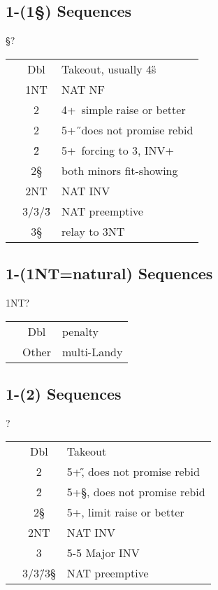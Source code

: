\subsection{1\D-(1\S) Sequences}

\begin{bidding}
\>\D{}\S\>?
\end{bidding}

\begin{longtable}{C{\linklength} C{\bidlength} l}
& Dbl & Takeout, usually 4\H s \\
& 1NT & NAT NF \\
& 2\C & 4+\D\ simple raise or better \\
& 2\D & 5+\H\ does not promise rebid \\
& 2\H & 5+\C\ forcing to 3\C, INV+ \\
& 2\S & both minors fit-showing \\
& 2NT & NAT INV \\
& 3\C/3\D/3\H & NAT preemptive \\ 
& 3\S & relay to 3NT \\ 
\end{longtable}

\subsection{1\D-(1NT=natural) Sequences}

\begin{bidding}
\>\D\>1NT\>?
\end{bidding}

\begin{longtable}{C{\linklength} C{\bidlength} l}
& Dbl & penalty \\
& Other & multi-Landy 
\end{longtable}


\subsection{1\D-(2\C) Sequences}

\begin{bidding}
\>\D{}\C\>?
\end{bidding}

\begin{longtable}{C{\linklength} C{\bidlength} l}
& Dbl & Takeout \\
& 2\D & 5+\H, does not promise rebid \\
& 2\H & 5+\S, does not promise rebid \\
& 2\S & 5+\D, limit raise or better \\
& 2NT & NAT INV \\
& 3\C & 5-5 Major INV \\
& 3\D/3\H/3\S & NAT preemptive \\  
\end{longtable}


